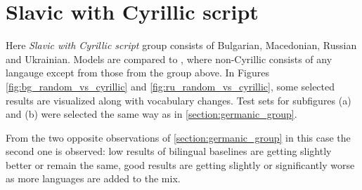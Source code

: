 \cleardoublepage

\section{Slavic with Cyrillic script}
\label{section:cyrillic_group}

Here \textit{Slavic with Cyrillic script} group consists of
Bulgarian, Macedonian, Russian and Ukrainian.
Models  are compared to ,
where non-Cyrillic consists of any langauge except from those from the group above.
In Figures \ref{fig:bg_random_vs_cyrillic} and \ref{fig:ru_random_vs_cyrillic},
some selected results are visualized along with vocabulary changes.
Test sets for subfigures (a) and (b) were
selected the same way as in \cref{section:germanic_group}.

From the two opposite observations of \ref{section:germanic_group} in this case
the second one is observed: low results of bilingual baselines
are getting slightly better or remain the same,
good results are getting slightly or significantly worse as more languages are
added to the mix.


